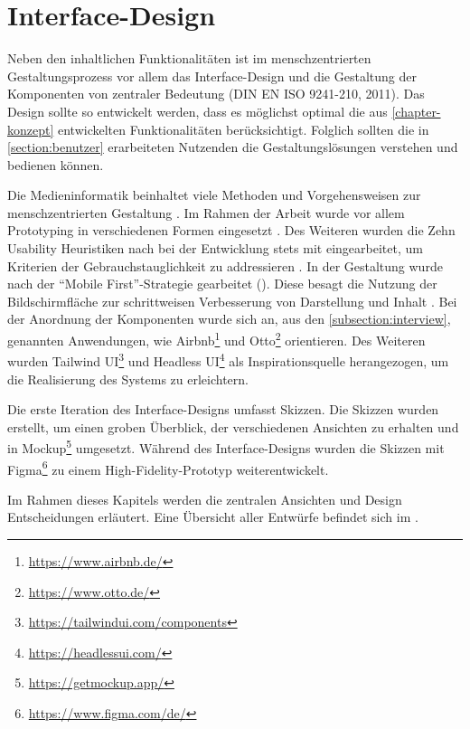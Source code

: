 \chapter{Interface-Design}
\label{chapter-design}
Neben den inhaltlichen Funktionalitäten ist im menschzentrierten Gestaltungsprozess vor allem das
Interface-Design und die Gestaltung der Komponenten von zentraler Bedeutung
\cite{din_en_iso_9421-2102020-03_din_nodate} (DIN EN ISO 9241-210, 2011). Das Design sollte so
entwickelt werden, dass es möglichst optimal die aus \ref{chapter-konzept} entwickelten
Funktionalitäten berücksichtigt. Folglich sollten die in \ref{section:benutzer} erarbeiteten
Nutzenden die Gestaltungslösungen verstehen und bedienen können.

Die Medieninformatik beinhaltet viele Methoden und Vorgehensweisen zur menschzentrierten Gestaltung
\cite{Herczeg2009}. Im Rahmen der Arbeit wurde vor allem Prototyping in verschiedenen Formen
eingesetzt \cite{herczeg_einfuhrung_2009}. Des Weiteren wurden die Zehn Usability Heuristiken nach
 bei der Entwicklung stets mit eingearbeitet, um Kriterien der
Gebrauchstauglichkeit zu addressieren . In
der Gestaltung wurde nach der \enquote{Mobile First}-Strategie gearbeitet (). Diese
besagt die Nutzung der Bildschirmfläche zur schrittweisen Verbesserung von Darstellung und Inhalt
\cite{kim_chapter_2013}. Bei der Anordnung der Komponenten wurde sich an, aus den \ref{subsection:interview}, genannten
Anwendungen, wie Airbnb\footnote{\url{https://www.airbnb.de/}} und
Otto\footnote{\url{https://www.otto.de/}} orientieren. Des Weiteren wurden Tailwind
UI\footnote{\url{https://tailwindui.com/components}} und Headless
UI\footnote{\url{https://headlessui.com/}} als Inspirationsquelle herangezogen, um die Realisierung
des Systems zu erleichtern.

Die erste Iteration des Interface-Designs umfasst Skizzen. Die Skizzen wurden erstellt, um einen
groben Überblick, der verschiedenen Ansichten zu erhalten und in
Mockup\footnote{\url{https://getmockup.app/}} umgesetzt. Während des Interface-Designs wurden die
Skizzen mit Figma\footnote{\url{https://www.figma.com/de/}} zu einem High-Fidelity-Prototyp
weiterentwickelt.

Im Rahmen dieses Kapitels werden die zentralen Ansichten und Design Entscheidungen erläutert. Eine
Übersicht aller Entwürfe befindet sich im .

